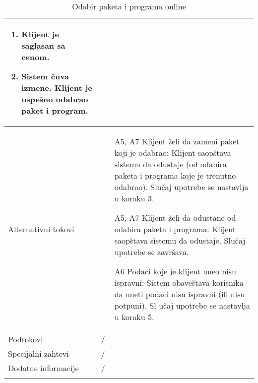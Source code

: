 \documentclass[../main.tex]{subfiles}
\begin{document}
\begin{longtable}{| p{} | p{} |}
\begin{enumerate}
        \item Klijent je saglasan sa cenom.
        \item Sistem čuva izmene. Klijent je uspešno odabrao paket i program.
    \end{enumerate}\\
\hline
    Alternativni tokovi & \begin{itemize}
        \item[A5, A7] Klijent želi da zameni paket koji je odabrao: Klijent saopštava sistemu da odustaje (od odabira paketa i programa koje je trenutno odabrao). Slučaj upotrebe se nastavlja u koraku 3.
        \item [A5, A7] Klijent želi da odustane od odabira paketa i programa: Klijent saopštava sistemu da odustaje. Slučaj upotrebe se završava.
        \item [A6] Podaci koje je klijent uneo nisu ispravni: Sistem obaveštava korisnika da uneti podaci nisu ispravni (ili nisu potpuni). Sl
        učaj upotrebe se nastavlja u koraku 5.
    \end{itemize}\\
\hline
    Podtokovi & /\\
\hline
    Specijalni zahtevi & /\\
\hline
    Dodatne informacije & /\\
\hline
\caption{Odabir paketa i programa online} %
\end{longtable}
\end{document}
